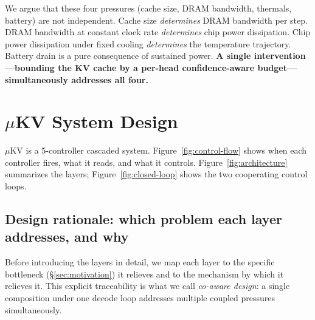 \documentclass[sigconf, anonymous=false, screen=true]{acmart}
\begin{document}
We argue that these four pressures (cache size, DRAM bandwidth, thermals, battery) are not independent. Cache size \emph{determines} DRAM bandwidth per step. DRAM bandwidth at constant clock rate \emph{determines} chip power dissipation. Chip power dissipation under fixed cooling \emph{determines} the temperature trajectory. Battery drain is a pure consequence of sustained power. \textbf{A single intervention---bounding the KV cache by a per-head confidence-aware budget---simultaneously addresses all four.}

\section{$\mu$KV System Design}
\label{sec:design}

\textsc{$\mu$KV} is a 5-controller cascaded system. Figure~\ref{fig:control-flow} shows when each controller fires, what it reads, and what it controls. Figure~\ref{fig:architecture} summarizes the layers; Figure~\ref{fig:closed-loop} shows the two cooperating control loops.

\subsection{Design rationale: which problem each layer addresses, and why}
\label{sec:design-overview}

Before introducing the layers in detail, we map each layer to the specific bottleneck (\S\ref{sec:motivation}) it relieves and to the mechanism by which it relieves it. This explicit traceability is what we call \emph{co-aware design}: a single composition under one decode loop addresses multiple coupled pressures simultaneously.
\end{document}
